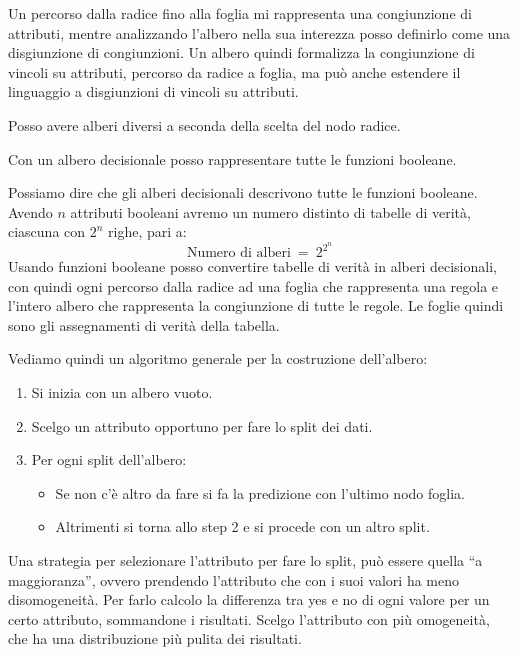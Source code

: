 Un percorso dalla radice fino alla foglia mi rappresenta una congiunzione di attributi, mentre analizzando l'albero nella sua interezza posso definirlo come una disgiunzione di congiunzioni. Un albero quindi formalizza la congiunzione di vincoli su attributi, percorso da radice a foglia, ma può anche estendere il linguaggio a disgiunzioni di vincoli su attributi.

Posso avere alberi diversi a seconda della scelta del nodo radice.
\begin{teorema}
    Con un albero decisionale posso rappresentare tutte le funzioni booleane.
\end{teorema}

Possiamo dire che gli alberi decisionali descrivono tutte le funzioni booleane. Avendo $n$ attributi booleani avremo un numero distinto di tabelle di verità, ciascuna con $2^n$ righe, pari a:
\begin{equation}
    \text{Numero di alberi} \ = \ 2^{2^n}
\end{equation}
Usando funzioni booleane posso convertire tabelle di verità in alberi decisionali, con quindi ogni percorso dalla radice ad una foglia che rappresenta una regola e l'intero albero che rappresenta la congiunzione di tutte le regole. Le foglie quindi sono gli assegnamenti di verità della tabella.

Vediamo quindi un algoritmo generale per la costruzione dell'albero:
\begin{enumerate}
    \item Si inizia con un albero vuoto.
    \item Scelgo un attributo opportuno per fare lo split dei dati.
    \item Per ogni split dell'albero:
    \begin{itemize}
        \item Se non c'è altro da fare si fa la predizione con l'ultimo nodo foglia.
        \item Altrimenti si torna allo step 2 e si procede con un altro split.
    \end{itemize}
\end{enumerate}
 
Una strategia per selezionare l'attributo per fare lo split, può essere quella “a maggioranza”, ovvero prendendo l'attributo che con i suoi valori ha meno disomogeneità. Per farlo calcolo la differenza tra yes e no di ogni valore per un certo attributo, sommandone i risultati. Scelgo l'attributo con più omogeneità, che ha una distribuzione più pulita dei risultati.

